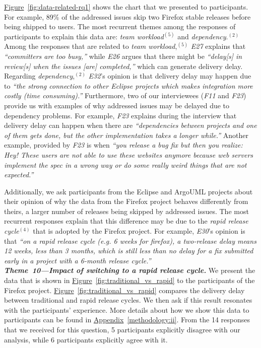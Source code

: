 {\hyperref[fig:data-related-rq1]{Figure}~\ref{fig:data-related-rq1} shows the
chart that we presented to participants. For example, 89\% of the addressed
issues skip two Firefox stable releases before being shipped to users. The most
recurrent themes among the responses of participants to explain this data are:
{\em team workload}$^{(5)}$ and {\em dependency}.$^{(2)}$ Among the responses that
are related to {\em team workload},$^{(5)}$ {\em E27} explains that {\em
``committers  are too busy,''} while {\em E26} argues that there might be {\em
``delay[s] in review[s] when the issues [are] completed,''} which can generate
delivery delay. Regarding {\em dependency},$^{(2)}$ {\em E32}'s opinion is
that delivery delay may happen due to {\em ``the strong connection to other
Eclipse projects which makes integration more costly (time consuming).''}
Furthermore, two of our interviewees ({\em F11} and {\em F23}) provide us with
examples of why addressed issues may be delayed due to dependency problems. For
example, {\em F23} explains during the interview that delivery delay can
happen when there are {\em ``dependencies between projects and one of them gets
done, but the other implementation takes a longer while.''} Another example,
provided by {\em F23} is when {\em ``you release a bug fix but then you realize:
	Hey! These users are not able to use these websites anymore because web
	servers implement the spec in a wrong way or do some really weird things
that are not expected.''}

Additionally, we ask participants from the Eclipse and ArgoUML projects about
their opinion of why the data from the Firefox project behaves differently from
theirs, \ie a larger number of releases being skipped by addressed issues. The
most recurrent responses explain that this difference may be due to the {\em
	rapid release cycle}$^{(4)}$ that is adopted by the Firefox project. For
	example, {\em E30}'s opinion is that {\em ``on a rapid release cycle
		(e.g. 6 weeks for firefox), a two-release delay means 12 weeks,
		less than 3 months, which is still less than no delay for a fix
		submitted early in a project with a 6-month release cycle.''} 
\\           

\noindent\textit{\textbf{Theme~10---Impact of switching to a rapid release
cycle.}}
We present the data that is shown in
\hyperref[fig:traditional_vs_rapid]{Figure}~\ref{fig:traditional_vs_rapid} to
the participants of the Firefox project.
\hyperref[fig:traditional_vs_rapid]{Figure}~\ref{fig:traditional_vs_rapid}
compares the delivery delay between traditional and rapid release cycles. We
then ask if this result resonates with the participants' experience. More
details about how we show this data to participants can be found in
\hyperref[methodology:ii]{Appendix}~\ref{methodology:ii}. From the 14 responses that we received for this
question, 5 participants explicitly disagree with our analysis, while 6
participants explicitly agree with it. 

}
